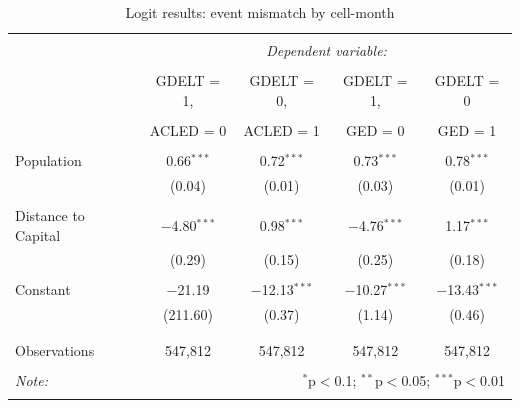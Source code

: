 \documentclass[hidelinks]{article}
\begin{document}
\begin{table}[!htbp] \centering 
  \caption{} 
  \label{} 
\begin{tabular}{@{\extracolsep{5pt}}lcccc} 
\\[-1.8ex]\hline 
\hline \\[-1.8ex] 
 & \multicolumn{4}{c}{\textit{Dependent variable:}} \\ 
\cline{2-5} 
\\[-1.8ex] & GDELT = 1, & GDELT = 0, & GDELT = 1, & GDELT = 0 \\ 
\\[-2.8ex] & ACLED = 0 & ACLED = 1 & GED = 0 & GED = 1 \\ 
\hline \\[-1.8ex] 
Population & 0.66$^{***}$ & 0.72$^{***}$ & 0.73$^{***}$ & 0.78$^{***}$ \\ 
  & (0.04) & (0.01) & (0.03) & (0.01) \\ 
  & & & & \\ 
Distance to Capital & $-$4.80$^{***}$ & 0.98$^{***}$ & $-$4.76$^{***}$ & 1.17$^{***}$ \\ 
  & (0.29) & (0.15) & (0.25) & (0.18) \\ 
  & & & & \\ 
 Constant & $-$21.19 & $-$12.13$^{***}$ & $-$10.27$^{***}$ & $-$13.43$^{***}$ \\ 
  & (211.60) & (0.37) & (1.14) & (0.46) \\ 
  & & & & \\ 
\hline \\[-1.8ex] 
Observations & 547,812 & 547,812 & 547,812 & 547,812 \\ 
\hline 
\hline \\[-1.8ex] 
\textit{Note:}  & \multicolumn{4}{r}{$^{*}$p$<$0.1; $^{**}$p$<$0.05; $^{***}$p$<$0.01} \\ 
\normalsize 
\end{tabular} 
\caption{Logit results: event mismatch by cell-month}
\end{table} 
\end{document}
